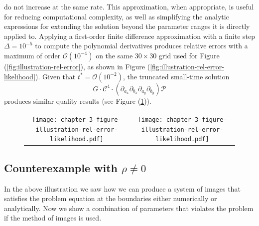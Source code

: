 \documentclass[10pt]{article}
\begin{document}
do not increase at the same rate. This approximation, when
appropriate, is useful for reducing computational complexity, as well
as simplifying the analytic expressions for extending the solution
beyond the parameter ranges it is directly applied to. Applying a
first-order finite difference approximation with a finite step
$\Delta = 10^{-5}$ to compute the polynomial derivatives produces
relative errors with a maximum of order $\mathcal{O}(10^{-4})$ on the
same $30 \times 30$ grid used for Figure
(\ref{fig:illustration-rel-error}), as shown in Figure
(\ref{fig:illustration-rel-error-likelihood}). Given that
$t^{*} = \mathcal{O}(10^{-2})$, the truncated small-time solution
\[G \cdot \mathcal{C}^4 \cdot \left(\partial_{a_x}\partial_{b_x}
    \partial_{a_y}\partial_{b_y} \right)\mathcal{P}\] produces similar
quality results (see Figure
(\ref{fig:illustration-rel-error-likelihood-truncated})).
\begin{figure}
  \begin{tabular}{cc}
    \begin{minipage}{0.40\textwidth}
      \centering
      \texttt{[image: chapter-3-figure-illustration-rel-error-likelihood.pdf]}
      \caption{}
      \label{fig:illustration-rel-error-likelihood}
    \end{minipage}
    & \begin{minipage}{0.40\textwidth}
      \centering
      \texttt{[image: chapter-3-figure-illustration-rel-error-likelihood.pdf]}
      \caption{}
      \label{fig:illustration-rel-error-likelihood-truncated}
    \end{minipage}
      \end{tabular}
\end{figure}



\subsection{Counterexample with $\rho \neq 0$}
In the above illustration we saw how we can produce a system of images
that satisfies the problem equation at the boundaries either
numerically or analytically. Now we show a combination of parameters
that violates the problem if the method of images is used.
\end{document}
